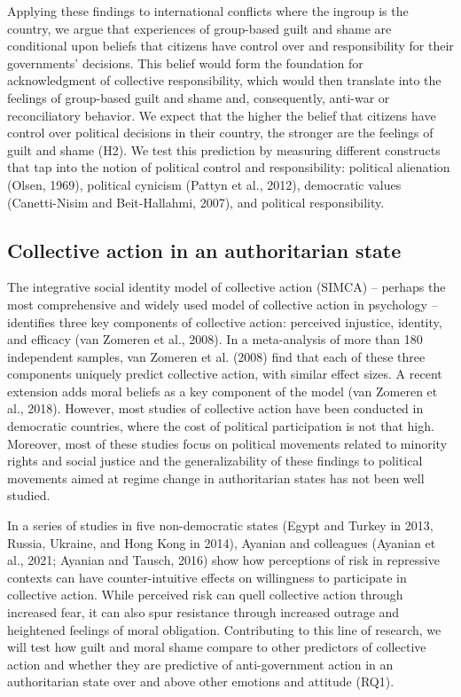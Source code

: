 \documentclass[
]{article}
\begin{document}
Applying these findings to international conflicts where the ingroup is the country, we argue that experiences of group-based guilt and shame are conditional upon beliefs that citizens have control over and responsibility for their governments' decisions. This belief would form the foundation for acknowledgment of collective responsibility, which would then translate into the feelings of group-based guilt and shame and, consequently, anti-war or reconciliatory behavior. We expect that the higher the belief that citizens have control over political decisions in their country, the stronger are the feelings of guilt and shame (H2). We test this prediction by measuring different constructs that tap into the notion of political control and responsibility: political alienation (Olsen, 1969), political cynicism (Pattyn et al., 2012), democratic values (Canetti-Nisim and Beit-Hallahmi, 2007), and political responsibility.

\hypertarget{collective-action-in-an-authoritarian-state}{%
\subsection*{Collective action in an authoritarian state}\label{collective-action-in-an-authoritarian-state}}

The integrative social identity model of collective action (SIMCA) -- perhaps the most comprehensive and widely used model of collective action in psychology -- identifies three key components of collective action: perceived injustice, identity, and efficacy (van Zomeren et al., 2008). In a meta-analysis of more than 180 independent samples, van Zomeren et al. (2008) find that each of these three components uniquely predict collective action, with similar effect sizes. A recent extension adds moral beliefs as a key component of the model (van Zomeren et al., 2018). However, most studies of collective action have been conducted in democratic countries, where the cost of political participation is not that high. Moreover, most of these studies focus on political movements related to minority rights and social justice and the generalizability of these findings to political movements aimed at regime change in authoritarian states has not been well studied.

In a series of studies in five non-democratic states (Egypt and Turkey in 2013, Russia, Ukraine, and Hong Kong in 2014), Ayanian and colleagues (Ayanian et al., 2021; Ayanian and Tausch, 2016) show how perceptions of risk in repressive contexts can have counter-intuitive effects on willingness to participate in collective action. While perceived risk can quell collective action through increased fear, it can also spur resistance through increased outrage and heightened feelings of moral obligation. Contributing to this line of research, we will test how guilt and moral shame compare to other predictors of collective action and whether they are predictive of anti-government action in an authoritarian state over and above other emotions and attitude (RQ1).
\end{document}
